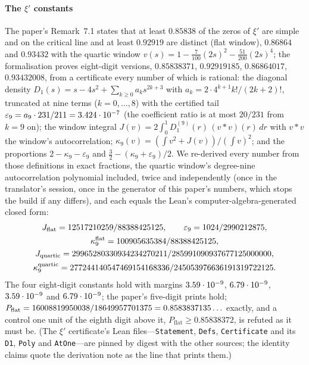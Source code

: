 \documentclass[preprint,11pt,authoryear,a4paper]{elsarticle}
\begin{document}
\paragraph{The $\xi'$ constants} The paper's Remark~7.1 states that at least $0.85838$ of the zeros of $\xi'$ are simple and on the critical line and at least $0.92919$ are distinct (flat window), $0.86864$ and $0.93432$ with the quartic window $v(s)=1-\tfrac7{100}(2s)^2-\tfrac{51}{200}(2s)^4$; the formalisation proves eight-digit versions, $0.85838371$, $0.92919185$, $0.86864017$, $0.93432008$, from a certificate every number of which is rational: the diagonal density $D_1(s)=s-4s^2+\sum_{k\ge0}a_ks^{2k+3}$ with $a_k=2\cdot4^{k+1}k!/(2k+2)!$, truncated at nine terms ($k=0,\ldots,8$) with the certified tail $\varepsilon_9=a_9\cdot231/211=3.424\cdot10^{-7}$ (the coefficient ratio is at most $20/231$ from $k=9$ on); the window integral $J(v)=2\int_0^1D_1^{(9)}(r)\,(v{*}v)(r)\,dr$ with $v{*}v$ the window's autocorrelation; $\kappa_9(v)=(\int v^2+J(v))/(\int v)^2$; and the proportions $2-\kappa_9-\varepsilon_9$ and $\tfrac32-(\kappa_9+\varepsilon_9)/2$. We re-derived every number from those definitions in exact fractions, the quartic window's degree-nine autocorrelation polynomial included, twice and independently (once in the translator's session, once in the generator of this paper's numbers, which stops the build if any differs), and each equals the Lean's computer-algebra-generated closed form:
\begin{gather*}
J_{\mathrm{flat}}=12517210259/88388425125,\qquad \varepsilon_9=1024/2990212875,\\
\kappa_9^{\mathrm{flat}}=100905635384/88388425125,\\
J_{\mathrm{quartic}}=29965280330934234270211/285991090937677125000000,\\
\kappa_9^{\mathrm{quartic}}=277244140547469154168336/245053976636191319722125.
\end{gather*}
The four eight-digit constants hold with margins $3.59\cdot10^{-9}$, $6.79\cdot10^{-9}$, $3.59\cdot10^{-9}$ and $6.79\cdot10^{-9}$; the paper's five-digit prints hold; $P_{\mathrm{flat}}=16008819950038/18649957701375=0.8583837135\ldots$ exactly, and a control one unit of the eighth digit above it, $P_{\mathrm{flat}}\ge0.85838372$, is refuted as it must be. (The $\xi'$ certificate's Lean files---\texttt{Statement}, \texttt{Defs}, \texttt{Certificate} and its \texttt{D1}, \texttt{Poly} and \texttt{AtOne}---are pinned by digest with the other sources; the identity claims quote the derivation note as the line that prints them.)
\end{document}
